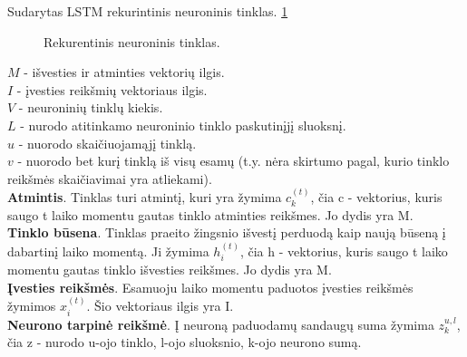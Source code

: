 Sudarytas LSTM rekurintinis neuroninis tinklas. \ref{fig:rnnnn}

\begin{figure}[h!]
  \centering
{}
\caption{Rekurentinis neuroninis tinklas.}
\label{fig:rnnnn}
\end{figure}


$M$ - išvesties ir atminties vektorių ilgis.\\
$I$ - įvesties reikšmių vektoriaus ilgis.\\
$V$ - neuroninių tinklų kiekis. \\
$L$ - nurodo atitinkamo neuroninio tinklo paskutinįjį sluoksnį.\\
$u$ - nuorodo skaičiuojamąjį tinklą.\\
$v$ - nuorodo bet kurį tinklą iš visų esamų (t.y. nėra skirtumo pagal, kurio tinklo reikšmės skaičiavimai yra atliekami).\\

\textbf{Atmintis}. Tinklas turi atmintį, kuri yra žymima $c_k^{(t)}$, čia c - vektorius, kuris saugo t laiko momentu gautas tinklo atminties reikšmes. Jo dydis yra M.\\

\textbf{Tinklo būsena}. Tinklas praeito žingsnio išvestį perduodą kaip naują būseną į dabartinį laiko momentą. Ji žymima $h_i^{(t)}$, čia h - vektorius, kuris saugo t laiko momentu gautas tinklo išvesties reikšmes. Jo dydis yra M. \\

\textbf{Įvesties reikšmės}. Esamuoju laiko momentu paduotos įvesties reikšmės žymimos $x_i^{(t)}$. Šio vektoriaus ilgis yra I. \\

\textbf{Neurono tarpinė reikšmė}. Į neuroną paduodamų sandaugų suma žymima $z_k^{u,l}$, čia z - nurodo u-ojo tinklo, l-ojo sluoksnio, k-ojo neurono sumą.\\

